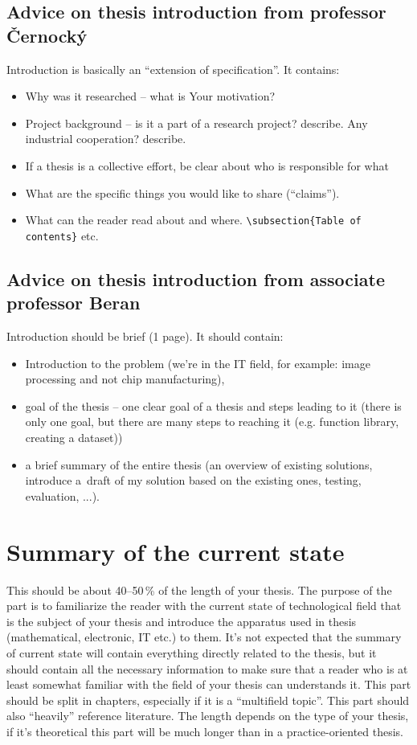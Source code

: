 \subsection{Advice on thesis introduction from professor Černocký}

Introduction is basically an ``extension of specification''. It contains:

\begin{itemize}
  \item{Why was it researched -- what is Your motivation?}
  \item{Project background -- is it a part of a research project? describe. Any industrial cooperation? describe.}
  \item{If a thesis is a collective effort, be clear about who is responsible for what}
  \item{What are the specific things you would like to share (``claims'').}
  \item{What can the reader read about and where. \texttt{\textbackslash subsection\{Table of contents\}} etc.}
\end{itemize}

\subsection{Advice on thesis introduction from associate professor Beran}

Introduction should be brief (1 page). It should contain:
\begin{itemize}
  \item{Introduction to the problem (we're in the IT field, for example: image processing and not chip manufacturing),}
  \item{goal of the thesis -- one clear goal of a thesis and steps leading to it (there is only one goal, but there are many steps to reaching it (e.g. function library, creating a dataset))}
  \item{a brief summary of the entire thesis (an overview of existing solutions, introduce a~draft of my solution based on the existing ones, testing, evaluation, ...).}
\end{itemize}


\section{Summary of the current state}
\label{stav}

This should be about 40--50\,\% of the length of your thesis. The purpose of the part is to familiarize the reader with the current state of technological field that is the subject of your thesis and introduce the apparatus used in thesis (mathematical, electronic, IT etc.) to them. It's not expected that the summary of current state will contain everything directly related to the thesis, but it should contain all the necessary information to make sure that a reader who is at least somewhat familiar with the field of your thesis can understands it. This part should be split in chapters, especially if it is a ``multifield topic''. This part should also ``heavily'' reference literature. The length depends on the type of your thesis, if it's theoretical this part will be much longer than in a practice-oriented thesis.


